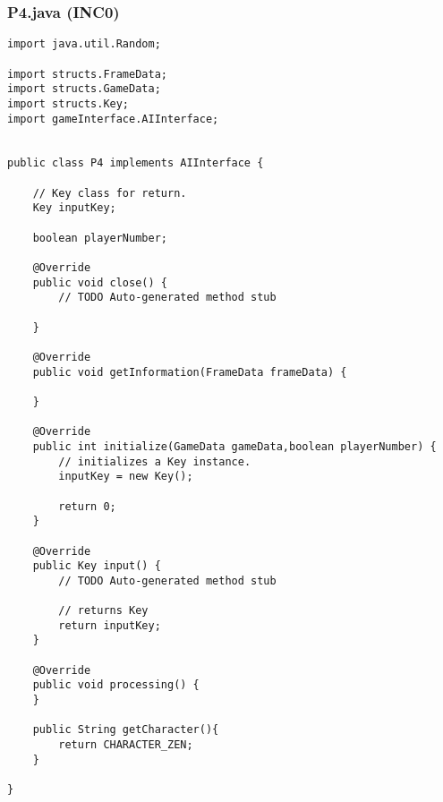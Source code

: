 \documentclass[12pt,a4paper]{article}
\begin{document}
\subsubsection{P4.java (INC0)}
\begin{lstlisting}
import java.util.Random;

import structs.FrameData;
import structs.GameData;
import structs.Key;
import gameInterface.AIInterface;


public class P4 implements AIInterface {

    // Key class for return.
    Key inputKey;

    boolean playerNumber;

    @Override
    public void close() {
        // TODO Auto-generated method stub

    }

    @Override
    public void getInformation(FrameData frameData) {

    }

    @Override
    public int initialize(GameData gameData,boolean playerNumber) {
        // initializes a Key instance.
        inputKey = new Key();

        return 0;
    }

    @Override
    public Key input() {
        // TODO Auto-generated method stub

        // returns Key
        return inputKey;
    }

    @Override
    public void processing() {
    }

    public String getCharacter(){
        return CHARACTER_ZEN;
    }

}

\end{lstlisting}
\newpage
\end{document}
